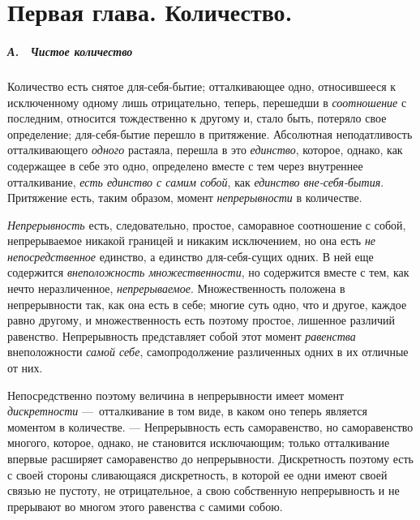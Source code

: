 \chapter*{Первая глава. Количество.}

\paragraph[А. \ Чистое количество]{А. \ Чистое количество}
Количество есть снятое для-себя-бытие; отталкивающее одно, относившееся к
исключенному одному лишь отрицательно, теперь, перешедши в
{\em соотношение} с последним, относится тождественно к
другому и, стало быть, потеряло свое определение; для-себя-бытие перешло в
притяжение. Абсолютная неподатливость отталкивающего
{\em одного} растаяла, перешла в это
{\em единство}, которое, однако, как содержащее в себе
это одно, определено вместе с тем через внутреннее отталкивание,
{\em есть единство с самим собой}, как
{\em единство вне-себя-бытия}. Притяжение есть, таким
образом, момент {\em непрерывности} в количестве.

{\em Непрерывность} есть, следовательно, простое,
саморавное соотношение с собой, непрерываемое никакой границей и никаким
исключением, но она есть {\em не непосредственное}
единство, а единство для-себя-сущих одних. В ней еще содержится
{\em внеположность множественности}, но содержится
вместе с тем, как нечто неразличенное,
{\em непрерываемое}. Множественность положена в
непрерывности так, как она есть в себе; многие суть одно, что и другое,
каждое равно другому, и множественность есть поэтому простое, лишенное
различий равенство. Непрерывность представляет собой этот момент
{\em равенства} внеположности
{\em самой себе}, самопродолжение различенных одних в
их отличные от них.

Непосредственно поэтому величина в непрерывности имеет момент
{\em дискретности} —~отталкивание в том виде, в каком
оно теперь является моментом в количестве. — Непрерывность есть
саморавенство, но саморавенство многого, которое, однако, не становится
исключающим; только отталкивание впервые расширяет саморавенство до
непрерывности. Дискретность поэтому есть с своей стороны сливающаяся
дискретность, в которой ее одни имеют своей связью не пустоту, не
отрицательное, а свою собственную непрерывность и не прерывают во многом
этого равенства с самими собою.

